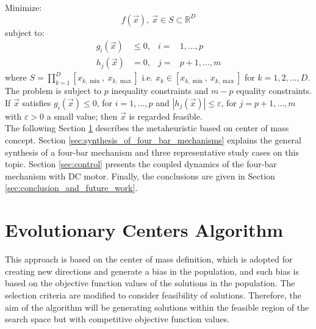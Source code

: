 \documentclass[12pt,letterpape]{article}
\begin{document}
\noindent
Minimize:
\begin{equation}
	f(\vec{x}),\ \vec{x}  \in S \subset \mathbb{R}^D
	\label{eqn:fx}
\end{equation}
%
subject to:
\begin{align}
	\label{eqn:gCop}
	g_i(\vec{x}) &\leq 0,& i =&  1 , \ldots, p \\
	h_j(\vec{x}) &= 0,& j =& p+1, \ldots, m
\end{align}
%
where $S = \prod_{k = 1}^D  [ x_{k,\min},\ x_{k,\max} ]$ i.e. $x_k \in [ x_{k,\min},\ x_{k,\max} ]$ 
for $k = 1,2,\ldots,D$. The problem is subject to $p$ inequality constraints and 
$m - p$ equality constraints. If $\vec{x}$ satisfies $g_i( \vec{x} ) \leq 0$, for 
$i = 1, \ldots, p$ and $|h_j(\vec{x})| \leq \varepsilon$, for $j = p+1, \ldots, m$ 
with $\varepsilon > 0$ a small value; then $\vec{x}$ is regarded feasible.\\


The following Section \ref{sec:eca} describes the metaheuristic based on center
of mass concept. Section \ref{sec:synthesis_of_four_bar_mechanisms} explains the
general synthesis of a four-bar mechanism and three representative study cases on
this topic. Section \ref{sec:control} presents the coupled dynamics of the
four-bar mechanism with DC motor. Finally, the conclusions are given in
Section \ref{sec:conclusion_and_future_work}.

% 
\section{Evolutionary Centers Algorithm} %
\label{sec:eca}

This approach is based on the center of mass definition, which is adopted for 
creating new directions and generate a bias in the population, and such bias is 
based on the objective function values of the solutions in the population. The 
selection criteria are modified to consider feasibility of solutions. Therefore, 
the aim of the algorithm will be generating solutions within the feasible region 
of the search space but with competitive objective function values.

%
%
\end{document}
